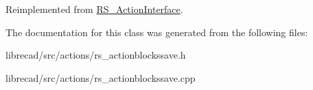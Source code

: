 Reimplemented from \hyperlink{classRS__ActionInterface_aa2ba8f6f697f735eace4ec5449c0b8cd}{R\-S\-\_\-\-Action\-Interface}.



The documentation for this class was generated from the following files\-:\begin{DoxyCompactItemize}
\item 
librecad/src/actions/rs\-\_\-actionblockssave.\-h\item 
librecad/src/actions/rs\-\_\-actionblockssave.\-cpp\end{DoxyCompactItemize}
